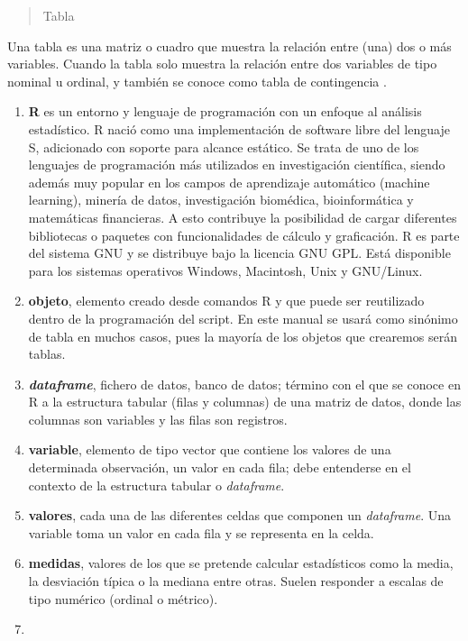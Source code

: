 \documentclass[
]{book}
\begin{document}
\begin{quote}
Tabla
\end{quote}

Una tabla es una matriz o cuadro que muestra la relación entre (una) dos o más variables. Cuando la tabla solo muestra la relación entre dos variables de tipo nominal u ordinal, y también se conoce como tabla de contingencia \citep{sanchez1989analisis}.

\begin{enumerate}
\def\labelenumi{\arabic{enumi}.}
\item
  \textbf{R} es un entorno y lenguaje de programación con un enfoque al análisis estadístico. R nació como una implementación de software libre del lenguaje S, adicionado con soporte para alcance estático. Se trata de uno de los lenguajes de programación más utilizados en investigación científica, siendo además muy popular en los campos de aprendizaje automático (machine learning), minería de datos, investigación biomédica, bioinformática y matemáticas financieras. A esto contribuye la posibilidad de cargar diferentes bibliotecas o paquetes con funcionalidades de cálculo y graficación. R es parte del sistema GNU y se distribuye bajo la licencia GNU GPL. Está disponible para los sistemas operativos Windows, Macintosh, Unix y GNU/Linux.
\item
  \textbf{objeto}, elemento creado desde comandos R y que puede ser reutilizado dentro de la programación del script. En este manual se usará como sinónimo de tabla en muchos casos, pues la mayoría de los objetos que crearemos serán tablas.
\item
  \textbf{\emph{dataframe}}, fichero de datos, banco de datos; término con el que se conoce en R a la estructura tabular (filas y columnas) de una matriz de datos, donde las columnas son variables y las filas son registros.
\item
  \textbf{variable}, elemento de tipo vector que contiene los valores de una determinada observación, un valor en cada fila; debe entenderse en el contexto de la estructura tabular o \emph{dataframe}.
\item
  \textbf{valores}, cada una de las diferentes celdas que componen un \emph{dataframe}. Una variable toma un valor en cada fila y se representa en la celda.
\item
  \textbf{medidas}, valores de los que se pretende calcular estadísticos como la media, la desviación típica o la mediana entre otras. Suelen responder a escalas de tipo numérico (ordinal o métrico).
\item

\end{enumerate}
\end{document}
